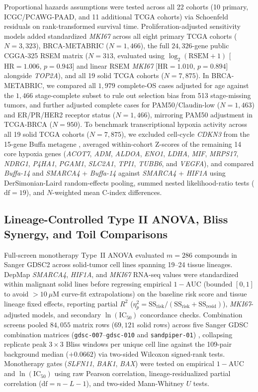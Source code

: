 \documentclass[10pt,twocolumn]{article}
\begin{document}
Proportional hazards assumptions were tested across all 22 cohorts (10 primary, ICGC/PCAWG-PAAD, and 11 additional TCGA cohorts) via Schoenfeld residuals on rank-transformed survival time. Proliferation-adjusted sensitivity models added standardized \textit{MKI67} across all eight primary TCGA cohorts ($N = 3,323$), BRCA-METABRIC ($N = 1,466$), the full $24,326$-gene public CGGA-325 RSEM matrix \cite{cgga2021} ($N = 313$, evaluated using $\log_2(\text{RSEM}+1)$ [$\text{HR} = 1.006$, $p = 0.943$] and linear RSEM \textit{MKI67} [$\text{HR} = 1.010$, $p = 0.894$] alongside \textit{TOP2A}), and all 19 solid TCGA cohorts ($N = 7,875$). In BRCA-METABRIC, we compared all $1,979$ complete-OS cases adjusted for age against the $1,466$ stage-complete subset to rule out selection bias from 513 stage-missing tumors, and further adjusted complete cases for PAM50/Claudin-low ($N = 1,463$) and ER/PR/HER2 receptor status ($N = 1,466$), mirroring PAM50 adjustment in TCGA-BRCA ($N = 950$). To benchmark transcriptional hypoxia activity across all 19 solid TCGA cohorts ($N = 7,875$), we excluded cell-cycle \textit{CDKN3} from the 15-gene Buffa metagene \cite{buffa2010}, averaged within-cohort Z-scores of the remaining 14 core hypoxia genes (\textit{ACOT7}, \textit{ADM}, \textit{ALDOA}, \textit{ENO1}, \textit{LDHA}, \textit{MIF}, \textit{MRPS17}, \textit{NDRG1}, \textit{P4HA1}, \textit{PGAM1}, \textit{SLC2A1}, \textit{TPI1}, \textit{TUBB6}, and \textit{VEGFA}), and compared \textit{Buffa-14} and \textit{SMARCA4} + \textit{Buffa-14} against \textit{SMARCA4} + \textit{HIF1A} using DerSimonian-Laird random-effects pooling, summed nested likelihood-ratio tests ($\text{df} = 19$), and $N$-weighted mean C-index differences.

\subsection{Lineage-Controlled Type II ANOVA, Bliss Synergy, and Toil Comparisons}
Full-screen monotherapy Type~II ANOVA evaluated $m = 286$ compounds in Sanger GDSC2 across solid-tumor cell lines spanning 19--24 tissue lineages. DepMap \textit{SMARCA4}, \textit{HIF1A}, and \textit{MKI67} RNA-seq values were standardized within malignant solid lines before regressing empirical $1 - \text{AUC}$ (bounded $[0, 1]$ to avoid $>10\ \mu\text{M}$ curve-fit extrapolations) on the baseline risk score and tissue lineage fixed effects, reporting partial $R^2$ ($\eta_p^2 = \text{SS}_{\text{risk}} / (\text{SS}_{\text{risk}} + \text{SS}_{\text{resid}})$), \textit{MKI67}-adjusted models, and secondary $\ln(\text{IC}_{50})$ concordance checks. Combination screens pooled $84,055$ matrix rows ($69,121$ solid rows) across five Sanger GDSC combination matrices (\texttt{gdsc-007}--\texttt{gdsc-010} and \texttt{sandpiper-01}) \cite{jaaks2022,bashi2024}, collapsing replicate peak $3 \times 3$ Bliss windows per unique cell line against the 109-pair background median ($+0.0662$) via two-sided Wilcoxon signed-rank tests. Monotherapy gates (\textit{SLFN11}, \textit{BAK1}, \textit{BAX}) were tested on empirical $1 - \text{AUC}$ and $\ln(\text{IC}_{50})$ using raw Pearson correlation, lineage-residualized partial correlation ($\text{df} = n - L - 1$), and two-sided Mann-Whitney $U$ tests.
\end{document}
